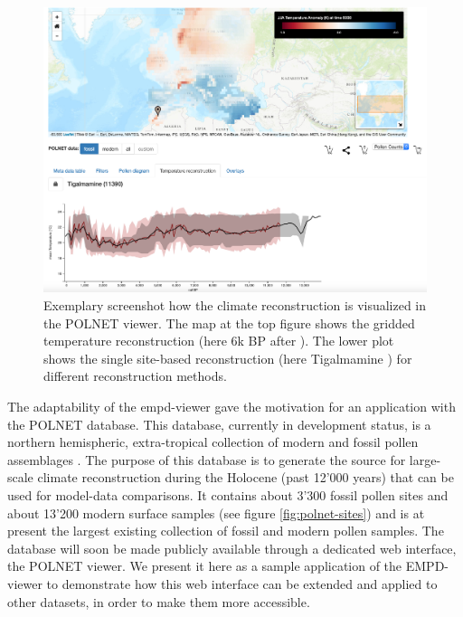 \begin{refsection}
\begin{figure}[h]
	\includegraphics[width=\linewidth]{empd-figures/polnet-climate-plots.png}
	\caption[Climate reconstructions visualized in the POLNET viewer]{Exemplary screenshot how the climate reconstruction is visualized in the POLNET viewer. The map at the top figure shows the gridded temperature reconstruction (here 6k BP after \cite{MauriDavisCollinsEtAl2015}). The lower plot shows the single site-based reconstruction (here Tigalmamine \citep{CheddadiLambGuiotEtAl1998}) for different reconstruction methods.}
	\label{fig:polnet-climate}
\end{figure}

The adaptability of the \gls{empd}-viewer gave the motivation for an application with the POLNET database. This database, currently in development status, is a northern hemispheric, extra-tropical collection of modern and fossil pollen assemblages \citep{DavisKaplan2017, SommerDavisChevalierEtAl2019}. The purpose of this database is to generate the source for large-scale climate reconstruction during the Holocene (past 12'000 years) that can be used for model-data comparisons. It contains about 3'300 fossil pollen sites and about 13'200 modern surface samples (see figure \ref{fig:polnet-sites}) and is at present the largest existing collection of fossil and modern pollen samples. The database will soon be made publicly available through a dedicated web interface, the POLNET viewer. We present it here as a sample application of the EMPD-viewer to demonstrate how this web interface can be extended and applied to other datasets, in order to make them more accessible.


\end{refsection}
